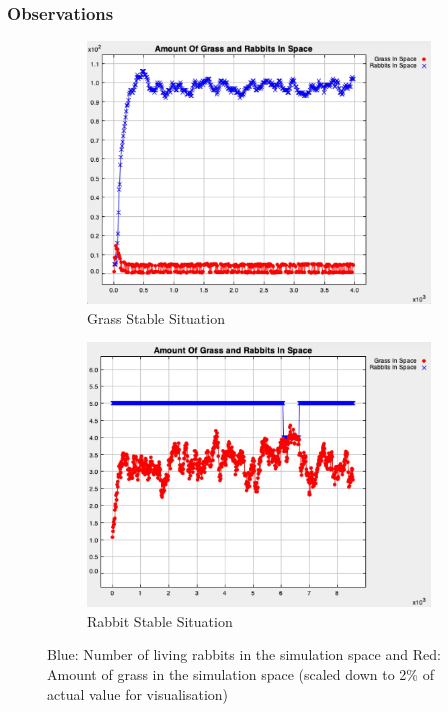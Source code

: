 \documentclass[11pt]{article}
\begin{document}
\subsubsection{Observations}

\begin{figure}[ht]
  \begin{subfigure}[t]{0.5\textwidth}
    \includegraphics[width=\textwidth, frame]{Fig2a.png}
    \caption{Grass Stable Situation}
    \label{fig:2a}
  \end{subfigure}
  \begin{subfigure}[t]{0.5\textwidth}
    \includegraphics[width=\textwidth, frame]{Fig2b.png}
    \caption{Rabbit Stable Situation}
    \label{fig:2b}
  \end{subfigure}
  \label{fig:5}\caption{Blue: Number of living rabbits in the simulation space and Red: Amount of grass in the simulation space (scaled down to 2\% of actual value for visualisation)}
\end{figure}
\end{document}
